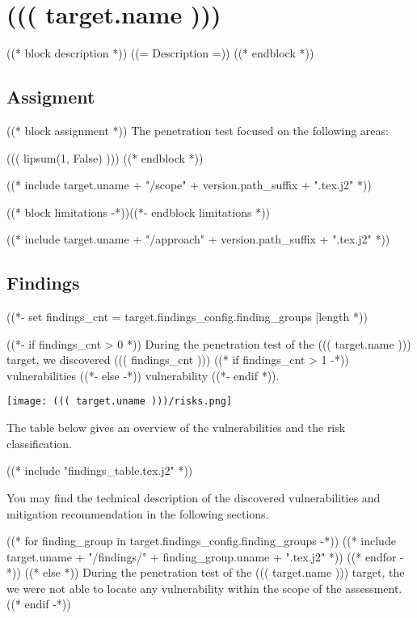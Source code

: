 \chapter{((( target.name )))}
\label{((( target.uname )))}

((* block description *))
    ((= Description =))
((* endblock *))

\section{Assigment}

((* block assignment *))
    The penetration test focused on the following areas:

    ((( lipsum(1, False) )))
((* endblock *))

((* include target.uname + "/scope" + version.path_suffix + ".tex.j2" *))

((* block limitations -*))((*- endblock limitations *))

((* include target.uname + "/approach" + version.path_suffix + ".tex.j2" *))

\section{Findings}
((*- set findings_cnt = target.findings_config.finding_groups |length *))

((*- if findings_cnt > 0 *))
  During the penetration test of the ((( target.name ))) target, we discovered ((( findings_cnt ))) ((* if findings_cnt > 1 -*)) vulnerabilities ((*- else -*)) vulnerability ((*- endif *)).

  \begin{center}
    \texttt{[image: ((( target.uname )))/risks.png]}
  \end{center}

  The table below gives an overview of the vulnerabilities and the risk classification.

  ((* include "findings_table.tex.j2" *))

  You may find the technical description of the discovered vulnerabilities and mitigation recommendation in the following sections.

  ((* for finding_group in target.findings_config.finding_groups -*))
    \clearpage
    ((* include target.uname + "/findings/" + finding_group.uname + ".tex.j2" *))
  ((* endfor -*))
((* else *))
    During the penetration test of the ((( target.name ))) target, the we were not able to locate any vulnerability within the scope of the assessment.
((* endif -*))

